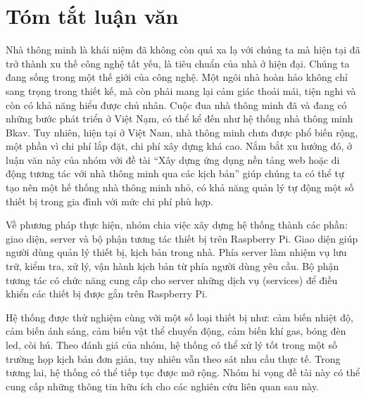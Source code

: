 \documentclass[12pt,a4paper,oneside]{extbook}
\begin{document}
\chapter*{Tóm tắt luận văn}
Nhà thông minh là khái niệm đã không còn quá xa lạ với chúng ta mà hiện tại 
đã trở thành xu thế công nghệ tất yếu, là tiêu chuẩn của nhà ở hiện đại. 
Chúng ta đang sống trong một thế giới của công nghệ. Một ngôi nhà hoàn hảo 
không chỉ sang trọng trong thiết kế, mà còn phải mang lại cảm giác thoải mái, tiện nghi và còn có khả năng hiểu được chủ nhân. Cuộc đua nhà thông minh đã và đang có những bước phát triển ở Việt Nạm, có thể kể đến như hệ thống nhà thông minh Bkav. Tuy nhiên, hiện tại ở Việt Nam, nhà thông minh chưa được phổ biến rộng, một phần vì chi phí lắp đặt, chi phí xây dựng khá cao. Nắm bắt xu hướng đó, ở luận văn này của nhóm với đề tài “Xây dựng ứng dụng nền tảng web hoặc di động tương tác với nhà thông minh qua các kịch bản” giúp chúng ta có thể tự tạo nên một hế thống nhà thông minh nhỏ, có khả năng quản lý tự động một số thiết bị trong gia đình với mức chi phí phù hợp.

Về phương pháp thực hiện, nhóm chia việc xây dựng hệ thống thành các phần: giao diện, server và bộ phận tương tác thiết bị trên Raspberry Pi. Giao diện giúp người dùng quản lý thiết bị, kịch bản trong nhà. Phía server làm nhiệm vụ lưu trữ, kiểm tra, xử lý, vận hành kịch bản từ phía người dùng yêu cầu. Bộ phận tương tác có chức năng cung cấp cho server những dịch vụ (services) để điều khiển các thiết bị được gắn trên Raspberry Pi.

Hệ thống được thử nghiệm cùng với một số loại thiết bị như: cảm biến nhiệt độ, cảm biến ánh sáng, cảm biến vật thể chuyển động, cảm biến khí gas, bóng đèn led, còi hú. Theo đánh giá của nhóm, hệ thống có thể xử lý tốt trong một số trường họp kịch bản đơn giản, tuy nhiên vẫn theo sát nhu cầu thực tế. Trong tương lai, hệ thống có thể tiếp tục được mở rộng. Nhóm hi vọng đề tài này có thể cung cấp những thông tin hữu ích cho các nghiên cứu liên quan sau này.

\begingroup
\let\cleardoublepage\clearpage
\tableofcontents 
% 
\endgroup

\renewcommand{\listtablename}{Danh mục bảng}
\listoftables
{}
\end{document}
